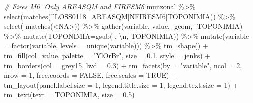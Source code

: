 \documentclass[10pt,landscape,a3paper]{article}
\newenvironment{Shaded}{\begin{snugshade}}{\end{snugshade}}
\newcommand{\AttributeTok}[1]{\textcolor[rgb]{0.77,0.63,0.00}{#1}}
\newcommand{\CommentTok}[1]{\textcolor[rgb]{0.56,0.35,0.01}{\textit{#1}}}
\newcommand{\ConstantTok}[1]{\textcolor[rgb]{0.00,0.00,0.00}{#1}}
\newcommand{\DecValTok}[1]{\textcolor[rgb]{0.00,0.00,0.81}{#1}}
\newcommand{\FloatTok}[1]{\textcolor[rgb]{0.00,0.00,0.81}{#1}}
\newcommand{\FunctionTok}[1]{\textcolor[rgb]{0.00,0.00,0.00}{#1}}
\newcommand{\NormalTok}[1]{#1}
\newcommand{\SpecialCharTok}[1]{\textcolor[rgb]{0.00,0.00,0.00}{#1}}
\newcommand{\StringTok}[1]{\textcolor[rgb]{0.31,0.60,0.02}{#1}}
\begin{document}
\begin{Shaded}
\begin{Highlighting}[]

\CommentTok{\# Fires M6. Only AREASQM and FIRESM6}
\NormalTok{munzonal }\SpecialCharTok{\%\textgreater{}\%} \FunctionTok{select}\NormalTok{(}\FunctionTok{matches}\NormalTok{(}\StringTok{\textquotesingle{}\^{}LOSS0118\_AREASQM|NFIRESM6|TOPONIMIA\textquotesingle{}}\NormalTok{)) }\SpecialCharTok{\%\textgreater{}\%} \FunctionTok{select}\NormalTok{(}\SpecialCharTok{{-}}\FunctionTok{matches}\NormalTok{(}\StringTok{\textquotesingle{}\textless{}NA\textgreater{}\textquotesingle{}}\NormalTok{)) }\SpecialCharTok{\%\textgreater{}\%} 
  \FunctionTok{gather}\NormalTok{(variable, value, }\SpecialCharTok{{-}}\NormalTok{geom, }\SpecialCharTok{{-}}\NormalTok{TOPONIMIA) }\SpecialCharTok{\%\textgreater{}\%}
  \FunctionTok{mutate}\NormalTok{(}\AttributeTok{TOPONIMIA=}\FunctionTok{gsub}\NormalTok{(}\StringTok{\textquotesingle{} \textquotesingle{}}\NormalTok{, }\StringTok{\textquotesingle{}}\SpecialCharTok{\textbackslash{}n}\StringTok{\textquotesingle{}}\NormalTok{, TOPONIMIA)) }\SpecialCharTok{\%\textgreater{}\%} 
  \FunctionTok{mutate}\NormalTok{(}\AttributeTok{variable =} \FunctionTok{factor}\NormalTok{(variable, }\AttributeTok{levels =} \FunctionTok{unique}\NormalTok{(variable))) }\SpecialCharTok{\%\textgreater{}\%} 
  \FunctionTok{tm\_shape}\NormalTok{() }\SpecialCharTok{+}
  \FunctionTok{tm\_fill}\NormalTok{(}\AttributeTok{col=}\StringTok{\textquotesingle{}value\textquotesingle{}}\NormalTok{, }\AttributeTok{palette =} \StringTok{"YlOrBr"}\NormalTok{, }\AttributeTok{size =} \FloatTok{0.1}\NormalTok{, }\AttributeTok{style =} \StringTok{\textquotesingle{}jenks\textquotesingle{}}\NormalTok{) }\SpecialCharTok{+}
  \FunctionTok{tm\_borders}\NormalTok{(}\AttributeTok{col =} \StringTok{\textquotesingle{}grey15\textquotesingle{}}\NormalTok{, }\AttributeTok{lwd =} \FloatTok{0.3}\NormalTok{) }\SpecialCharTok{+}
  \FunctionTok{tm\_facets}\NormalTok{(}\AttributeTok{by =} \StringTok{"variable"}\NormalTok{, }\AttributeTok{ncol =} \DecValTok{2}\NormalTok{, }\AttributeTok{nrow =} \DecValTok{1}\NormalTok{, }\AttributeTok{free.coords =} \ConstantTok{FALSE}\NormalTok{, }\AttributeTok{free.scales =} \ConstantTok{TRUE}\NormalTok{) }\SpecialCharTok{+}
  \FunctionTok{tm\_layout}\NormalTok{(}\AttributeTok{panel.label.size =} \DecValTok{1}\NormalTok{, }\AttributeTok{legend.title.size =} \DecValTok{1}\NormalTok{, }\AttributeTok{legend.text.size =} \DecValTok{1}\NormalTok{) }\SpecialCharTok{+}
  \FunctionTok{tm\_text}\NormalTok{(}\AttributeTok{text =} \StringTok{\textquotesingle{}TOPONIMIA\textquotesingle{}}\NormalTok{, }\AttributeTok{size =} \FloatTok{0.5}\NormalTok{)}
\end{Highlighting}
\end{Shaded}
\end{document}
